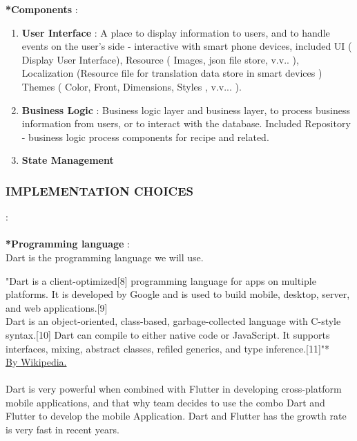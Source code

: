 \documentclass{article}
\begin{document}
\textbf{*Components} :
    \begin{enumerate}
        \item \textbf{User Interface} : A place to display information to users, and to handle events on the user's side - interactive with smart phone devices, included UI ( Display User Interface), Resource ( Images, json file store, v.v.. ), Localization (Resource file for translation data store in smart devices ) Themes ( Color, Front, Dimensions, Styles , v.v... ). 
        \item \textbf{Business Logic } : Business logic layer and business layer, to process business information from users, or to interact with the database. Included Repository - business logic process components for recipe and related.
        \item \textbf{ State Management } 
    \end{enumerate}
\newpage
\subsubsection{IMPLEMENTATION CHOICES} : \\ \\
\textbf{*Programming language} :\\
Dart is the programming language we will use.

"Dart is a client-optimized[8] programming language for apps on multiple platforms. It is developed by Google and is used to build mobile, desktop, server, and web applications.[9] \\
Dart is an object-oriented, class-based, garbage-collected language with C-style syntax.[10] Dart can compile to either native code or JavaScript. It supports interfaces, mixing, abstract classes, refiled generics, and type inference.[11]"* \\
\href{https://en.wikipedia.org/wiki/Dart_(programming_language)}{By Wikipedia.}\\\\
Dart is very powerful when combined with Flutter in developing cross-platform mobile applications, and that why team decides to use the combo Dart and Flutter to develop the mobile Application.
Dart and Flutter has the growth rate is very fast in recent years.
\end{document}
